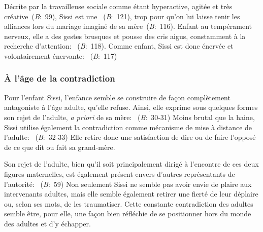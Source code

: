 \par
Décrite par la travailleuse sociale comme étant hyperactive, agitée et très créative~(\textit{B}:~99), Sissi est une ~(\textit{B}:~121), trop  pour qu'on lui laisse tenir les alliances lors du mariage imaginé de sa mère~(\textit{B}:~116).
Enfant au tempérament nerveux, elle a des gestes brusques et pousse des cris aigus, constamment à la recherche d'attention: ~(\textit{B}:~118).
Comme enfant, Sissi est donc énervée et volontairement énervante: ~(\textit{B}:~117)

\subsubsection{À l'âge de la contradiction}
Pour l'enfant Sissi, l'enfance semble se construire de façon complètement antagoniste à l'âge adulte, qu'elle refuse.
Ainsi, elle exprime sous quelques formes son rejet de l'adulte, \textit{a priori} de sa mère: ~(\textit{B}:~30-31)
Moins brutal que la haine, Sissi utilise également la contradiction comme mécanisme de mise à distance de l'adulte: ~(\textit{B}:~32-33)
Elle retire donc une satisfaction de dire ou de faire l'opposé de ce que dit ou fait sa grand-mère.
\par
Son rejet de l'adulte, bien qu'il soit principalement dirigé à l'encontre de ces deux figures maternelles, est également présent envers d'autres représentants de l'autorité:  ~(\textit{B}:~59)
Non seulement Sissi ne semble pas avoir envie de plaire aux intervenants adultes, mais elle semble également retirer une fierté de leur déplaire ou, selon ses mots, de les traumatiser.
Cette constante contradiction des adultes semble être, pour elle, une façon bien réfléchie de se positionner hors du monde des adultes et d'y échapper.

